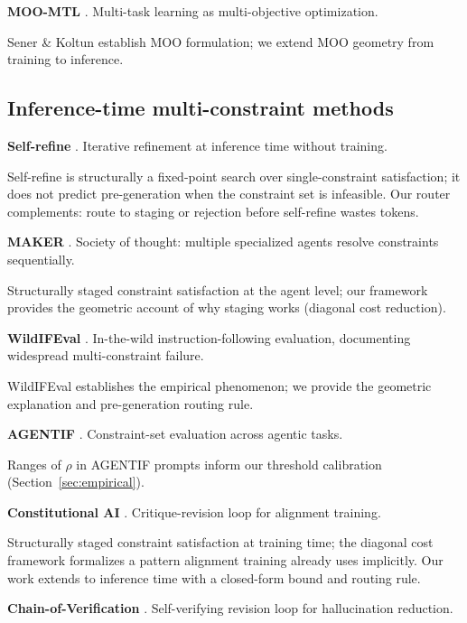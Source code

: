 \hypertarget{rw:moo_mtl}{}\textbf{MOO-MTL} \citep{sener2018multi}.
Multi-task learning as multi-objective optimization.

Sener \& Koltun establish MOO formulation; we extend MOO geometry
from training to inference.

\subsection{Inference-time multi-constraint methods}

\hypertarget{rw:selfrefine}{}\textbf{Self-refine} \citep{madaan2023selfrefine}.
Iterative refinement at inference time without training.

Self-refine is structurally a fixed-point search over single-constraint
satisfaction; it does not predict pre-generation when the constraint set is
infeasible. Our router complements: route to staging or rejection before
self-refine wastes tokens.

\hypertarget{rw:maker}{}\textbf{MAKER} \citep{meyerson2025maker}.
Society of thought: multiple specialized agents resolve constraints
sequentially.

Structurally staged constraint satisfaction at the agent level; our
framework provides the geometric account of why staging works (diagonal cost
reduction).

\hypertarget{rw:wildifeval}{}\textbf{WildIFEval} \citep{lior2025wildifeval}.
In-the-wild instruction-following evaluation, documenting widespread
multi-constraint failure.

WildIFEval establishes the empirical phenomenon; we provide the
geometric explanation and pre-generation routing rule.

\hypertarget{rw:agentif}{}\textbf{AGENTIF} \citep{qi2025agentif}.
Constraint-set evaluation across agentic tasks.

Ranges of $\rho$ in AGENTIF prompts inform our threshold calibration
(Section~\ref{sec:empirical}).

\hypertarget{rw:cai}{}\textbf{Constitutional AI} \citep{bai2022constitutional}.
Critique-revision loop for alignment training.

Structurally staged constraint satisfaction at training time; the
diagonal cost framework formalizes a pattern alignment training already uses
implicitly. Our work extends to inference time with a closed-form bound and
routing rule.

\hypertarget{rw:cove}{}\textbf{Chain-of-Verification} \citep{dhuliawala2023chainofverification}.
Self-verifying revision loop for hallucination reduction.

